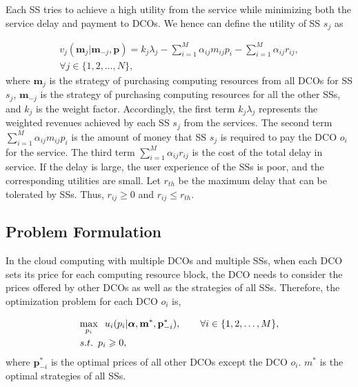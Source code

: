\documentclass[twocolumn,10pt]{IEEEtran}
\begin{document}
Each SS tries to achieve a high utility from the service while minimizing both the service delay and payment to DCOs. We hence can define the utility of SS $s_j$ as

\begin{equation}
\begin{array}{r}
  v_{j}(\mathbf{m}_j| \mathbf{m}_{-j}, \mathbf{p}) = k_j \lambda_j - \sum\limits_{i = 1}^M \alpha _{ij}m_{ij}p_{i}-  \sum\limits_{i = 1}^M \alpha _{ij}r_{ij}, \\
  \forall j \in \{1,2,\ldots,N\},
  \end{array}
\end{equation}
where $\mathbf{m}_{j}$ is the strategy of purchasing computing resources from all DCOs for SS $s_j$,  $\mathbf{m}_{-j}$ is the strategy of purchasing computing resources for all the other SSs, and $k_j$ is the weight factor. Accordingly, the first term $k_j \lambda_j$ represents the weighted revenues achieved by each SS $s_j$ from the services. The second term $\sum\limits_{i = 1}^M \alpha _{ij}m_{ij}p_{i}$ is the amount of money that SS $s_j$ is required to pay the DCO $o_i$ for the service. The third term $\sum\limits_{i = 1}^M \alpha _{ij}r_{ij}$ is the cost of the total delay in service. If the delay is large, the user experience of the SSs is poor, and the corresponding utilities are small. Let $r_{th}$ be the maximum delay that can be tolerated by SSs. Thus, ${{r_{ij}} \geqslant 0}$ and ${{r_{ij}} \leqslant r_{th}}$.




\subsection{Problem Formulation}\label{sec:problem formulation}

In the cloud computing with multiple DCOs and multiple SSs, when each DCO sets its price for each computing resource block, the DCO needs to consider the prices offered by other DCOs as well as the strategies of all SSs. Therefore, the optimization problem for each DCO $o_i$ is,

\begin{equation}
    \begin{array}{l}
     \begin{gathered}
 \mathop {\max }\limits_{{p}_i} \;{\kern 1pt} \,u_{i} (  {p_i}| \boldsymbol{\alpha}, \mathbf{m}^*, \mathbf{p}^*_{-i}), \qquad \forall i \in \{1,2,\ldots,M\},\hfill \\
  s.t.  {\begin{array}{*{20}{l}}
  {p_{i} \geqslant 0},
\end{array}}  \hfill
\end{gathered}
    \end{array}
\end{equation}
where $\mathbf{p}^*_{-i}$ is the optimal prices of all other DCOs except the DCO $o_i$. $m^*$ is the optimal strategies of all SSs.
\end{document}
